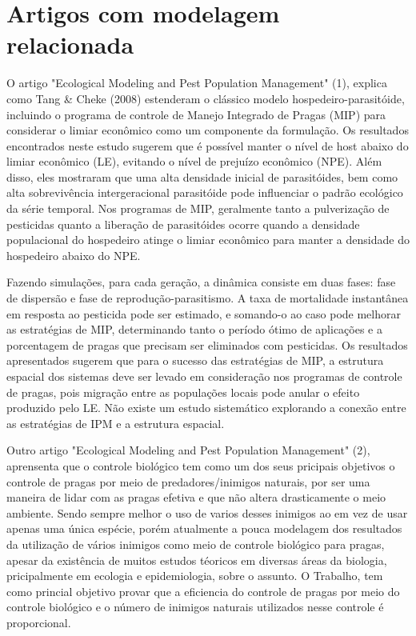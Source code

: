 \section{Artigos com modelagem relacionada}

O artigo "Ecological Modeling and Pest Population Management" (1), explica como Tang & Cheke (2008) estenderam o clássico modelo hospedeiro-parasitóide, incluindo o programa de controle de Manejo Integrado de Pragas (MIP) para considerar o limiar econômico como um componente da formulação. Os resultados encontrados neste estudo sugerem que é possível manter o nível de host abaixo do limiar econômico (LE), evitando o nível de prejuízo econômico (NPE). Além disso, eles mostraram que uma alta densidade inicial de parasitóides, bem como alta sobrevivência intergeracional parasitóide pode influenciar o padrão ecológico da série temporal. Nos programas de MIP, geralmente tanto a pulverização de pesticidas quanto a liberação de parasitóides ocorre quando a densidade populacional do hospedeiro atinge o limiar econômico para manter a densidade do hospedeiro abaixo do NPE. 

Fazendo simulações, para cada geração, a dinâmica consiste em duas fases: fase de dispersão e fase de reprodução-parasitismo. A taxa de mortalidade instantânea em resposta ao pesticida pode ser estimado, e somando-o ao caso pode melhorar as estratégias de MIP, determinando tanto o período ótimo de aplicações e a porcentagem de pragas que
precisam ser eliminados com pesticidas. Os resultados apresentados sugerem que para o sucesso das estratégias de MIP, a estrutura espacial dos sistemas deve ser levado em consideração nos programas de controle de pragas, pois migração entre as populações locais pode anular o efeito produzido pelo LE. Não existe um estudo sistemático explorando a conexão entre as estratégias de IPM e a estrutura espacial. 

\medskip

Outro artigo "Ecological Modeling and Pest Population Management" (2), aprensenta que o controle biológico tem como um dos seus pricipais objetivos o controle de pragas por meio de predadores/inimigos naturais, por ser uma maneira de lidar com as pragas efetiva e que não altera drasticamente o meio ambiente. Sendo sempre melhor o uso de varios desses inimigos ao em vez de usar apenas uma única espécie, porém atualmente a pouca modelagem dos resultados da utilização de vários inimigos como meio de controle biológico para pragas, apesar da existência de muitos estudos téoricos em diversas áreas da biologia, pricipalmente em ecologia e epidemiologia, sobre o assunto. O Trabalho, tem como princial objetivo provar que a eficiencia do controle de pragas por meio do controle biológico e o número de inimigos naturais utilizados nesse controle é proporcional.

